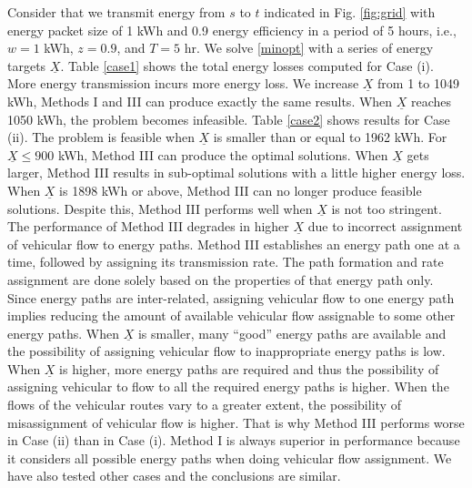 \documentclass[journal]{IEEEtran}
\begin{document}
Consider that we transmit energy from $s$ to $t$ indicated in Fig. \ref{fig:grid} with energy packet size of 1 kWh and 0.9 energy efficiency in a period of 5 hours, i.e., $w=1$ kWh, $z=0.9$, and $T=5$ hr. We solve \eqref{minopt} with a series of energy targets $\underline{X}$. Table \ref{case1} shows the total energy losses computed for Case (i). More energy transmission incurs more energy loss. We increase $\underline{X}$ from 1 to 1049 kWh, Methods I and III can produce exactly the same results. When $\underline{X}$ reaches 1050 kWh, the problem becomes infeasible. Table \ref{case2} shows results for Case (ii). The problem is feasible when $\underline{X}$ is smaller than or equal to 1962 kWh. For $\underline{X}\leq 900$ kWh, Method III can produce the optimal solutions. When $\underline{X}$ gets larger, Method III results in sub-optimal solutions with a little higher energy loss. When $\underline{X}$ is 1898 kWh or above, Method III can no longer produce feasible solutions. Despite this, Method III performs well when $\underline{X}$ is not too stringent. 
The performance of Method III degrades in higher $\underline{X}$ due to incorrect assignment of vehicular flow to energy paths. Method III establishes an energy path one at a time, followed by assigning its transmission rate. The path formation and rate assignment are done solely based on the properties of that energy path only. Since energy paths are inter-related, assigning vehicular flow to one energy path implies reducing the amount of available vehicular flow assignable to some other energy paths. When $\underline{X}$ is smaller, many ``good'' energy paths are available and the possibility of assigning vehicular flow to inappropriate energy paths is low. When $\underline{X}$ is higher, more energy paths are required and thus the possibility of assigning vehicular to flow to all the required energy paths is higher. When the flows of the vehicular routes vary to a greater extent, the possibility of misassignment of vehicular flow is higher. That is why Method III performs worse in Case (ii) than in Case (i). Method I is always superior in performance because it considers all possible energy paths when doing vehicular flow assignment.  
We have also tested other cases and the conclusions are similar. 
\end{document}
